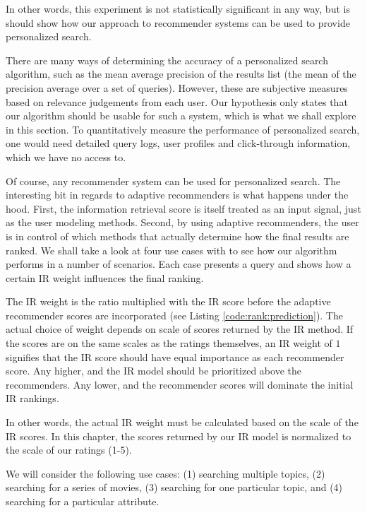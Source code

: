 In other words, this experiment is not statistically significant in any way,
but is should show how our approach to recommender systems
can be used to provide personalized search.

There are many ways of determining the accuracy of a personalized search
algorithm, such as the mean average precision of the results list
(the mean of the precision average over a set of queries).
However, these are subjective measures based on relevance judgements from each user.
Our hypothesis only states that our algorithm should be usable for such 
a system, which is what we shall explore in this section.
To quantitatively measure the performance of personalized search,
one would need detailed query logs, user profiles and click-through information,
which we have no access to.

Of course, any recommender system can be used for personalized search.
The interesting bit in regards to adaptive recommenders is what 
happens under the hood. First, the information retrieval score 
is itself treated as an input signal, just as the user modeling methods.
Second, by using adaptive recommenders, the user is in control of which
methods that actually determine how the final results are ranked.
We shall take a look at four use cases with to see how our algorithm
performs in a number of scenarios. Each case presents 
a query and shows how a certain IR weight influences the final ranking.

The IR weight is the ratio multiplied with the IR score 
before the adaptive recommender scores are incorporated
(see Listing \ref{code:rank:prediction}).
The actual choice of weight depends on scale of scores
returned by the IR method.
If the scores are on the same scales as the ratings themselves,
an IR weight of $1$ signifies that the IR score
should have equal importance as each recommender score.
Any higher, and the IR model should be prioritized above the recommenders.
Any lower, and the recommender scores will dominate the initial IR rankings.

In other words, the actual IR weight must
be calculated based on the scale of the IR scores.
In this chapter, the scores returned by our IR
model is normalized to the scale of our ratings (1-5).

We will consider the following use cases:
(1) searching multiple topics,
(2) searching for a series of movies,
(3) searching for one particular topic, and
(4) searching for a particular attribute.


\afterpage{\clearpage}

